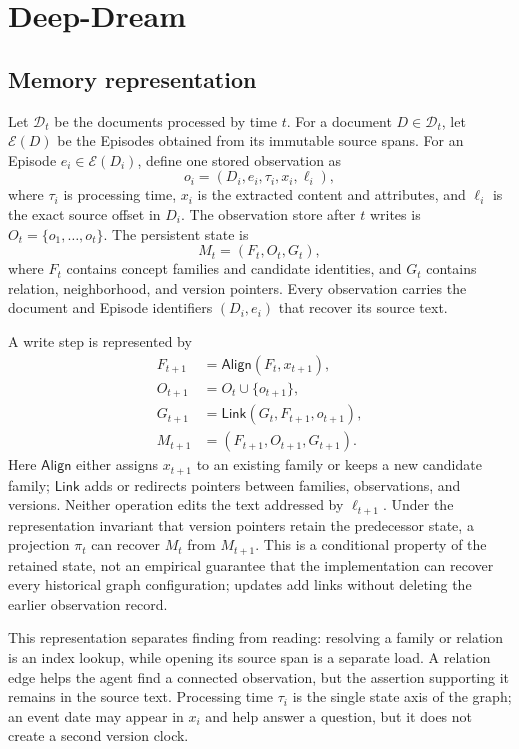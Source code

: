\section{Deep-Dream}
\label{sec:deep-dream}

\subsection{Memory representation}

Let $\mathcal D_t$ be the documents processed by time $t$. For a document $D\in\mathcal D_t$, let $\mathcal E(D)$ be the Episodes obtained from its immutable source spans. For an Episode $e_i\in\mathcal E(D_i)$, define one stored observation as
\[
o_i=(D_i,e_i,\tau_i,x_i,\ell_i),
\]
where $\tau_i$ is processing time, $x_i$ is the extracted content and attributes, and $\ell_i$ is the exact source offset in $D_i$. The observation store after $t$ writes is $O_t=\{o_1,\ldots,o_t\}$. The persistent state is
\[
M_t=(F_t,O_t,G_t),
\]
where $F_t$ contains concept families and candidate identities, and $G_t$ contains relation, neighborhood, and version pointers. Every observation carries the document and Episode identifiers $(D_i,e_i)$ that recover its source text.

A write step is represented by
\begin{equation}
\begin{aligned}
F_{t+1}&=\mathsf{Align}(F_t,x_{t+1}),\\
O_{t+1}&=O_t\cup\{o_{t+1}\},\\
G_{t+1}&=\mathsf{Link}(G_t,F_{t+1},o_{t+1}),\\
M_{t+1}&=(F_{t+1},O_{t+1},G_{t+1}).
\end{aligned}
\label{eq:state-transition}
\end{equation}
Here $\mathsf{Align}$ either assigns $x_{t+1}$ to an existing family or keeps a new candidate family; $\mathsf{Link}$ adds or redirects pointers between families, observations, and versions. Neither operation edits the text addressed by $\ell_{t+1}$. Under the representation invariant that version pointers retain the predecessor state, a projection $\pi_t$ can recover $M_t$ from $M_{t+1}$. This is a conditional property of the retained state, not an empirical guarantee that the implementation can recover every historical graph configuration; updates add links without deleting the earlier observation record.

This representation separates finding from reading: resolving a family or relation is an index lookup, while opening its source span is a separate load. A relation edge helps the agent find a connected observation, but the assertion supporting it remains in the source text. Processing time $\tau_i$ is the single state axis of the graph; an event date may appear in $x_i$ and help answer a question, but it does not create a second version clock.

